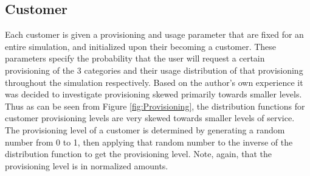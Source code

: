 \documentclass[12pt]{article} %
\begin{document}
    \subsection{Customer}
    Each customer is given a provisioning and usage parameter that are fixed for an entire simulation, and initialized upon their becoming a customer.
    These parameters specify the probability that the user will request a certain provisioning of the 3 categories and their usage distribution of that provisioning throughout the simulation respectively.
    Based on the author's own experience it was decided to investigate provisioning skewed primarily towards smaller levels.  
    Thus as can be seen from Figure \ref{fig:Provisioning}, the distribution functions for customer provisioning levels are very skewed towards smaller levels of service.
    The provisioning level of a customer is determined by generating a random number from 0 to 1, then applying that random number to the inverse of the distribution function to get the provisioning level.  Note, again, that the provisioning level is in normalized amounts.
\end{document}
